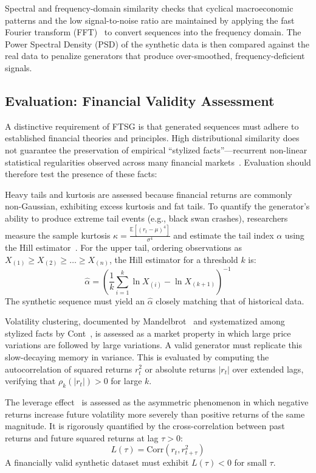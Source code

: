 Spectral and frequency-domain similarity checks that cyclical macroeconomic patterns and the low signal-to-noise ratio are maintained by applying the fast Fourier transform (FFT)~\citep{cooley1965algorithm} to convert sequences into the frequency domain. The Power Spectral Density (PSD) of the synthetic data is then compared against the real data to penalize generators that produce over-smoothed, frequency-deficient signals.

\subsection{Evaluation: Financial Validity Assessment}
A distinctive requirement of FTSG is that generated sequences must adhere to established financial theories and principles. High distributional similarity does not guarantee the preservation of empirical ``stylized facts''—recurrent non-linear statistical regularities observed across many financial markets~\citep{cont2001empirical}. Evaluation should therefore test the presence of these facts:

Heavy tails and kurtosis are assessed because financial returns are commonly non-Gaussian, exhibiting excess kurtosis and fat tails. To quantify the generator's ability to produce extreme tail events (e.g., black swan crashes), researchers measure the sample kurtosis $\kappa = \frac{\mathbb{E}[(r_t - \mu)^4]}{\sigma^4}$ and estimate the tail index $\alpha$ using the Hill estimator~\citep{hill1975simple}. For the upper tail, ordering observations as $X_{(1)} \ge X_{(2)} \ge \dots \ge X_{(n)}$, the Hill estimator for a threshold $k$ is:
    \begin{equation}
        \hat{\alpha} = \left( \frac{1}{k} \sum_{i=1}^k \ln X_{(i)} - \ln X_{(k+1)} \right)^{-1}
    \end{equation}
The synthetic sequence must yield an $\hat{\alpha}$ closely matching that of historical data.

Volatility clustering, documented by Mandelbrot~\citep{mandelbrot1963variation} and systematized among stylized facts by Cont~\citep{cont2001empirical}, is assessed as a market property in which large price variations are followed by large variations. A valid generator must replicate this slow-decaying memory in variance. This is evaluated by computing the autocorrelation of squared returns $r_t^2$ or absolute returns $|r_t|$ over extended lags, verifying that $\rho_k(|r_t|) > 0$ for large $k$.

The leverage effect~\citep{black1976studies,cont2001empirical} is assessed as the asymmetric phenomenon in which negative returns increase future volatility more severely than positive returns of the same magnitude. It is rigorously quantified by the cross-correlation between past returns and future squared returns at lag $\tau > 0$:
    \begin{equation}
        L(\tau) = \text{Corr}(r_t, r_{t+\tau}^2)
    \end{equation}
A financially valid synthetic dataset must exhibit $L(\tau) < 0$ for small $\tau$.

